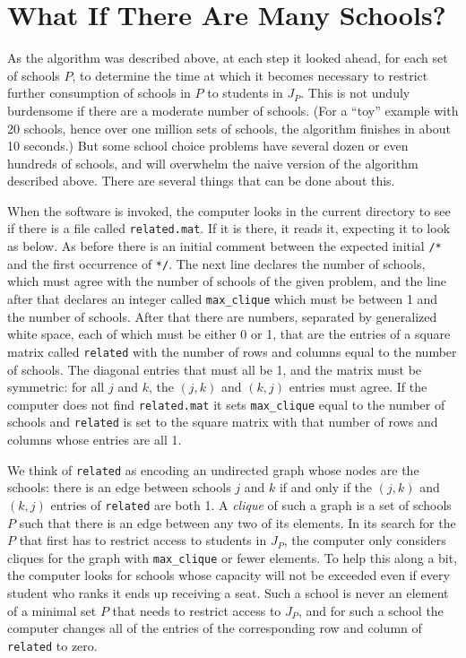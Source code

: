 \documentclass[12pt]{article}
\theoremstyle{definition}
\begin{document}
\section{What If There Are Many Schools?}

As the algorithm was described above, at each step it looked ahead,
for each set of schools $P$, to determine the time at which it becomes
necessary to restrict further consumption of schools in $P$ to
students in $J_P$.  This is not unduly burdensome if there are a
moderate number of schools.  (For a ``toy'' example with 20 schools,
hence over one million sets of schools, the algorithm finishes in
about 10 seconds.)  But some school choice problems have several dozen
or even hundreds of schools, and will overwhelm the naive version of
the algorithm described above.  There are several things that can be
done about this.

When the software is invoked, the computer looks in the current
directory to see if there is a file called \texttt{related.mat}.  If
it is there, it reads it, expecting it to look as below.  As before
there is an initial comment between the expected initial \texttt{/*}
and the first occurrence of \texttt{*/}.  The next line declares the
number of schools, which must agree with the number of schools of the
given problem, and the line after that declares an integer called
\texttt{max\_clique} which must be between 1 and the number of
schools.  After that there are numbers, separated by generalized white
space, each of which must be either 0 or 1, that are the entries of a
square matrix called \texttt{related} with the number of rows and
columns equal to the number of schools.  The diagonal entries that
must all be 1, and the matrix must be symmetric: for all $j$ and $k$,
the $(j,k)$ and $(k,j)$ entries must agree.  If the computer does not
find \texttt{related.mat} it sets \texttt{max\_clique} equal to the
number of schools and \texttt{related} is set to the square matrix
with that number of rows and columns whose entries are all 1.

We think of \texttt{related} as encoding an undirected graph whose
nodes are the schools: there is an edge between schools $j$ and $k$ if
and only if the $(j,k)$ and $(k,j)$ entries of \texttt{related} are
both 1. A \emph{clique} of such a graph is a set of schools $P$ such
that there is an edge between any two of its elements.  In its search
for the $P$ that first has to restrict access to students in $J_P$,
the computer only considers cliques for the graph with
\texttt{max\_clique} or fewer elements.  To help this along a bit, the
computer looks for schools whose capacity will not be exceeded even if
every student who ranks it ends up receiving a seat.  Such a school is
never an element of a minimal set $P$ that needs to restrict access to
$J_P$, and for such a school the computer changes all of the entries
of the corresponding row and column of \texttt{related} to zero.
\end{document}
